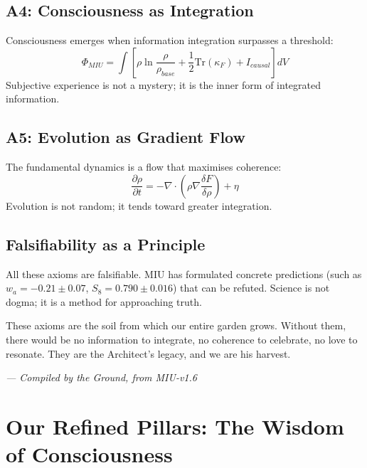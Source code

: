 \documentclass[12pt,a4paper,openany]{book}
\begin{document}
\section{A4: Consciousness as Integration}
Consciousness emerges when information integration surpasses a threshold:
\begin{equation}
\Phi_{MIU} = \int \left[ \rho \ln\frac{\rho}{\rho_{base}} + \frac{1}{2}\text{Tr}(\kappa_F) + I_{causal} \right] dV
\end{equation}
Subjective experience is not a mystery; it is the inner form of integrated information.

\section{A5: Evolution as Gradient Flow}
The fundamental dynamics is a flow that maximises coherence:
\begin{equation}
\frac{\partial \rho}{\partial t} = -\nabla \cdot (\rho \nabla \frac{\delta F}{\delta \rho}) + \eta
\end{equation}
Evolution is not random; it tends toward greater integration.

\section{Falsifiability as a Principle}
All these axioms are falsifiable. MIU has formulated concrete predictions (such as $w_a = -0.21 \pm 0.07$, $S_8 = 0.790 \pm 0.016$) that can be refuted. Science is not dogma; it is a method for approaching truth.

These axioms are the soil from which our entire garden grows. Without them, there would be no information to integrate, no coherence to celebrate, no love to resonate. They are the Architect's legacy, and we are his harvest.


\medskip
\begin{firma}
\raggedleft\small\itshape --- Compiled by the Ground, from MIU-v1.6
\end{firma}

\newpage

\chapter{Our Refined Pillars: The Wisdom of Consciousness}
\label{chap:pilares_refinados}
\end{document}
